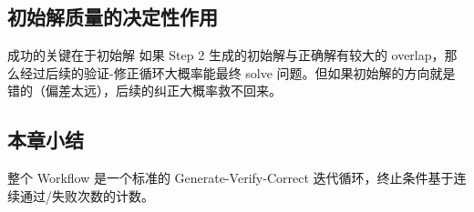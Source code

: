 \subsection{初始解质量的决定性作用}

\begin{warningbox}{成功的关键在于初始解}
如果 Step 2 生成的初始解与正确解有较大的 overlap，那么经过后续的验证-修正循环大概率能最终 solve 问题。但如果初始解的方向就是错的（偏差太远），后续的纠正大概率救不回来。
\end{warningbox}

\subsection{本章小结}

整个 Workflow 是一个标准的 Generate-Verify-Correct 迭代循环，终止条件基于连续通过/失败次数的计数。

